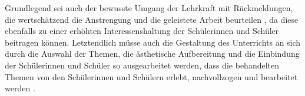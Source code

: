 Grundlegend sei auch der bewusste Umgang der Lehrkraft mit \glqq Rückmeldungen, die wertschätzend die Anstrengung und die geleistete Arbeit beurteilen\grqq{} \cite[S.\,25]{GDS13}, da diese ebenfalls zu einer erhöhten Interessenshaltung der Schülerinnen und Schüler beitragen können. 
Letztendlich müsse auch die Gestaltung des Unterrichts an sich durch die Auswahl der Themen, die ästhetische Aufbereitung und die Einbindung der Schülerinnen und Schüler so ausgearbeitet werden, dass die behandelten Themen \glqq von den Schülerinnen und Schülern erlebt, nachvollzogen und bearbeitet werden\grqq{} \cite[S.\,25]{GDS13}.






